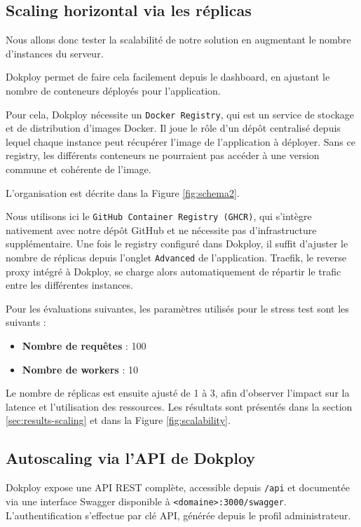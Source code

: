 \documentclass{rapportClass} %
\begin{document}
\subsection{Scaling horizontal via les réplicas}
Nous allons donc tester la scalabilité de notre solution en augmentant le nombre d'instances du serveur. 

\smallskip
Dokploy permet de faire cela facilement depuis le dashboard, en ajustant le nombre de conteneurs déployés pour 
l'application.

Pour cela, Dokploy nécessite un \texttt{Docker Registry}, qui est un service de stockage et de distribution d'images Docker. 
Il joue le rôle d'un dépôt centralisé depuis lequel chaque instance peut récupérer l'image de l'application à déployer. 
Sans ce registry, les différents conteneurs ne pourraient pas accéder à une version commune et cohérente de l'image.

L'organisation est décrite dans la Figure \ref{fig:schema2}.

Nous utilisons ici le \texttt{GitHub Container Registry (GHCR)}, qui s'intègre nativement avec notre dépôt GitHub et 
ne nécessite pas d'infrastructure supplémentaire. Une fois le registry configuré dans Dokploy, il suffit d'ajuster 
le nombre de réplicas depuis l'onglet \texttt{Advanced} de l'application. Traefik, le reverse proxy intégré à Dokploy, 
se charge alors automatiquement de répartir le trafic entre les différentes instances.

Pour les évaluations suivantes, les paramètres utilisés pour le stress test sont les suivants :
\begin{itemize}
\item \textbf{Nombre de requêtes} : 100
\item \textbf{Nombre de workers} : 10
\end{itemize}
Le nombre de réplicas est ensuite ajusté de 1 à 3, afin d'observer l'impact sur la latence et l'utilisation des ressources.
Les résultats sont présentés dans la section \ref{sec:results-scaling} et dans la Figure \ref{fig:scalability}.


\subsection{Autoscaling via l'API de Dokploy}
\label{sec:autoscaling}

Dokploy expose une API REST complète, accessible depuis
\texttt{/api} et documentée via une interface Swagger disponible
à \texttt{<domaine>:3000/swagger}. L'authentification s'effectue
par clé API, générée depuis le profil administrateur.
\end{document}
